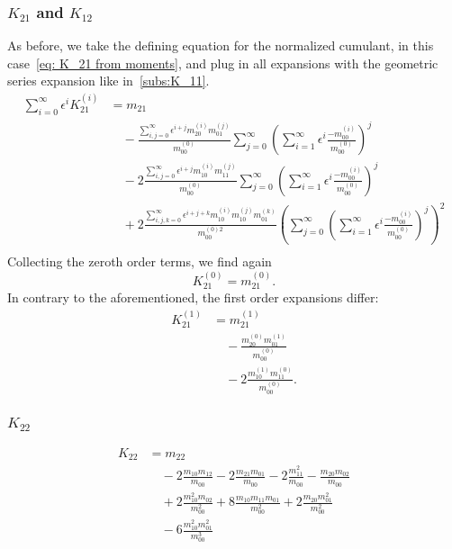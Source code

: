 \subsubsection{\texorpdfstring{$K_{21}$}{K 21} and \texorpdfstring{$K_{12}$}{K 12}}
\label{subs:K_21}
As before, we take the defining equation for the normalized cumulant, in this case~\eqref{eq: K_21 from moments}, and plug in all expansions with the geometric series expansion like in~\ref{subs:K_11}.
\begin{equation}
  \begin{aligned}
    \sum_{i=0}^\infty \epsilon^i K_{21}^{(i)}
    & = m_{21}
    \\ &\quad
    - \frac{\sum_{i,j=0}^\infty \epsilon^{i+j} m_{20}^{(i)} m_{01}^{(j)}}{m_{00}^{(0)}}
      \sum_{j=0}^\infty {\left(\sum_{i=1}^\infty \epsilon^i \frac{ - m_{00}^{(i)}}{ m_{00}^{(0)}}\right)}^j
    \\ &\quad
     - 2\frac{\sum_{i,j=0}^\infty \epsilon^{i+j} m_{10}^{(i)} m_{11}^{(j)}}{m_{00}^{(0)}}
      \sum_{j=0}^\infty {\left(\sum_{i=1}^\infty \epsilon^i \frac{ - m_{00}^{(i)}}{ m_{00}^{(0)}}\right)}^j
     \\ &\quad
     + 2\frac{\sum_{i,j,k=0}^\infty \epsilon^{i+j+k} m_{10}^{(i)} m_{10}^{(j)} m_{01}^{(k)}}{m_{00}^{(0)2}}
      {\left(
        \sum_{j=0}^\infty {\left(\sum_{i=1}^\infty \epsilon^i \frac{ - m_{00}^{(i)}}{ m_{00}^{(0)}}\right)}^j
      \right)}^2\\
   \end{aligned}
\end{equation}
Collecting the zeroth order terms, we find again
\begin{equation}
  K_{21}^{(0)} = m_{21}^{(0)}.
\end{equation}
In contrary to the aforementioned, the first order expansions differ:
\begin{equation}
  \begin{aligned}
    K_{21}^{(1)} & = m_{21}^{(1)}
    \\ &\quad
    - \frac{m_{20}^{(0)} m_{01}^{(1)}}{m_{00}^{(0)}}
    \\ &\quad
    - 2\frac{m_{10}^{(1)} m_{11}^{(0)}}{m_{00}^{(0)}}.
  \end{aligned}
\end{equation}

\subsubsection{\texorpdfstring{$K_{22}$}{K 22}}
\label{subs:K_22}
\begin{equation}
  \begin{aligned}
K_{22} & = m_{22} \\
     & \quad - 2 \frac{m_{10}m_{12}}{m_{00}} - 2\frac{m_{21}m_{01}}{m_{00}}
      - 2 \frac{m_{11}^2}{m_{00}} - \frac{m_{20}m_{02}}{m_{00}} \\
     & \quad + 2 \frac{m_{10}^2 m_{02}}{m_{00}^2} + 8 \frac{m_{10}m_{11}m_{01}}{m_{00}^2}
      + 2 \frac{m_{20}m_{01}^2}{m_{00}^2} \\
     & \quad - 6 \frac{m_{10}^2 m_{01}^2}{m_{00}^3}
   \end{aligned}
 \end{equation}
